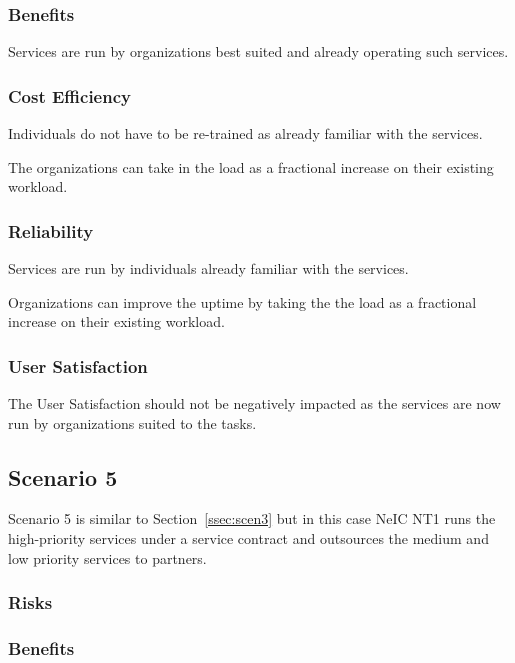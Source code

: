 \documentclass[12pt,a4paper]{article}
\begin{document}
\subsubsection*{Benefits}
\bitm
\item Services are run by organizations best suited and already operating such services.
\eitm

\subsubsection*{Cost Efficiency}
\bitm
\item Individuals do not have to be re-trained as already familiar with the services.
\item The organizations can take in the \ED load as a fractional increase on their existing workload.
\eitm

\subsubsection*{Reliability}
\bitm
\item Services are run by individuals already familiar with the services.
\item Organizations can improve the uptime by taking the the \ED load as a fractional increase on their existing workload.
\eitm

\subsubsection*{User Satisfaction}
\bitm
\item The User Satisfaction should not be negatively impacted as the services are now run by organizations suited to the tasks.
  \eitm
  
\subsection{Scenario 5}
\label{ssec:scen5}

Scenario 5 is similar to Section~\ref{ssec:scen3} but in this case
NeIC NT1 runs the high-priority services under a service contract and \EC outsources the medium and low priority services to partners.


\subsubsection*{Risks}
\bitm
\item 
\eitm

\subsubsection*{Benefits}
\bitm
\item 
\eitm
\end{document}
